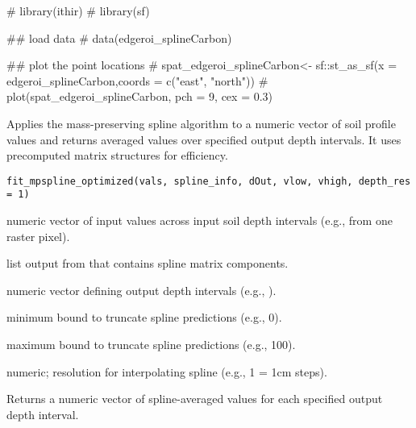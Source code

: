 \documentclass[a4paper]{book}
\begin{document}
%
\begin{Examples}
\begin{ExampleCode}

# library(ithir)
# library(sf)

## load data
# data(edgeroi_splineCarbon)

## plot the point locations
# spat_edgeroi_splineCarbon<- sf::st_as_sf(x = edgeroi_splineCarbon,coords = c("east", "north"))
# plot(spat_edgeroi_splineCarbon, pch = 9, cex = 0.3)

\end{ExampleCode}
\end{Examples}
%
\begin{Description}
Applies the mass-preserving spline algorithm to a numeric vector of soil profile values and returns averaged values over specified output depth intervals. 
It uses precomputed matrix structures for efficiency.
\end{Description}
%
\begin{Usage}
\begin{verbatim}
fit_mpspline_optimized(vals, spline_info, dOut, vlow, vhigh, depth_res = 1)
\end{verbatim}
\end{Usage}
%
\begin{Arguments}
\begin{ldescription}
\item[\code{vals}] numeric vector of input values across input soil depth intervals (e.g., from one raster pixel).
\item[\code{spline\_info}] list output from  that contains spline matrix components.
\item[\code{dOut}] numeric vector defining output depth intervals (e.g., ).
\item[\code{vlow}] minimum bound to truncate spline predictions (e.g., 0).
\item[\code{vhigh}] maximum bound to truncate spline predictions (e.g., 100).
\item[\code{depth\_res}] numeric; resolution for interpolating spline (e.g., 1 = 1cm steps).
\end{ldescription}
\end{Arguments}
%
\begin{Value}
Returns a numeric vector of spline-averaged values for each specified output depth interval.
\end{Value}
\end{document}
